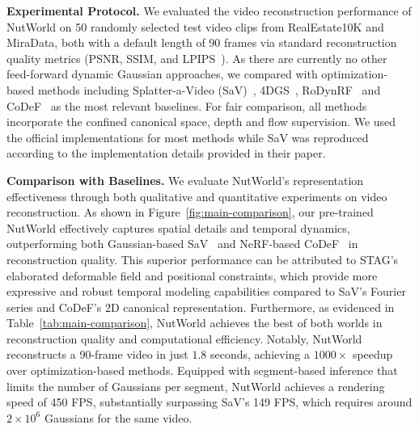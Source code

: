 
\noindent \textbf{Experimental Protocol.} We evaluated the video reconstruction performance of NutWorld on 50 randomly selected test video clips from RealEstate10K and MiraData, both with a default length of 90 frames via standard reconstruction quality metrics (PSNR, SSIM, and LPIPS~\cite{zhang2018perceptual}). As there are currently no other feed-forward dynamic Gaussian approaches, we compared with optimization-based methods including Splatter-a-Video (SaV)~\cite{sun2024splatter}, 4DGS~\cite{wu20244d}, RoDynRF~\cite{liu2023robust} and CoDeF~\cite{ouyang2024codef} as the most relevant baselines. For fair comparison, all methods incorporate the confined canonical space, depth and flow supervision. We used the official implementations for most methods while SaV was reproduced according to the implementation details provided in their paper. 

\noindent \textbf{Comparison with Baselines.}
We evaluate NutWorld's representation effectiveness through both qualitative and quantitative experiments on video reconstruction.
As shown in Figure~\ref{fig:main-comparison}, our pre-trained NutWorld effectively captures spatial details and temporal dynamics, outperforming both Gaussian-based SaV~\cite{sun2024splatter} and NeRF-based CoDeF~\cite{ouyang2024codef} in reconstruction quality. This superior performance can be attributed to STAG's elaborated deformable field and positional constraints, which provide more expressive and robust temporal modeling capabilities compared to SaV's Fourier series and CoDeF's 2D canonical representation.
Furthermore, as evidenced in Table~\ref{tab:main-comparison}, NutWorld achieves the best of both worlds in reconstruction quality and computational efficiency. Notably, 
NutWorld reconstructs a 90-frame video in just $1.8$ seconds, achieving a $1000\times$ speedup over optimization-based methods. Equipped with segment-based inference that limits the number of Gaussians per segment, NutWorld achieves a rendering speed of 450 FPS, substantially surpassing SaV's 149 FPS, which requires around $2 \times 10^6$ Gaussians for the same video.






